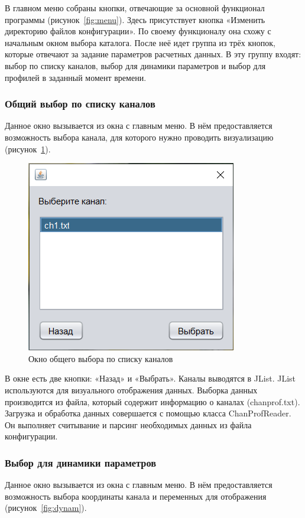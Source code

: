 В главном меню собраны кнопки, отвечающие за основной функционал программы (рисунок~\ref{fig:menu}). Здесь присутствует кнопка «Изменить директорию файлов конфигурации». По своему функционалу она схожу с начальным окном выбора каталога. После неё идет группа из трёх кнопок, которые отвечают за задание параметров расчетных данных. В эту группу входят: выбор по списку каналов, выбор для динамики параметров и выбор для профилей в заданный момент времени. 

\subsubsection{Общий выбор по списку каналов}

Данное окно вызывается из окна с главным меню. В нём предоставляется возможность выбора канала, для которого нужно проводить визуализацию (рисунок~\ref{fig:chan}).
\begin{figure}[H]
	\centering
	\includegraphics[width=0.4\linewidth]{pics/chan}
	\caption{Окно общего выбора по списку каналов}
	\label{fig:chan}
\end{figure}

В окне есть две кнопки: «Назад» и «Выбрать». Каналы выводятся в JList. JList используются для визуального отображения данных.  Выборка данных производится из файла, который содержит информацию о каналах (chanprof.txt). Загрузка и обработка данных совершается с помощью класса ChanProfReader. Он выполняет считывание и парсинг необходимых данных из файла конфигурации. 


\subsubsection{Выбор для динамики параметров}
Данное окно вызывается из окна с главным меню. В нём предоставляется возможность выбора координаты канала и переменных для отображения (рисунок~\ref{fig:dynam}).

